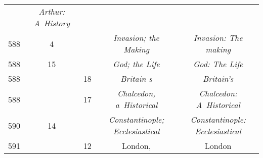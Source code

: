 \documentclass[a4paper,11pt]{article}
\begin{document}
\begin{center}
\begin{tabular}{|c|c|c|c|c|}
    & \textit{Arthur: A~History} \\
    588 & \hphantom{0}4 & & \textit{Invasion; the Making}
           & \textit{Invasion: The making} \\
    588 & 15 & & \textit{God; the Life} & \textit{God: The Life} \\
    588 & & 18 & \textit{Britain s} & \textit{Britain's} \\
    588 & & 17 & \textit{Chalcedon, a~Historical}
           & \textit{Chalcedon: A~Historical} \\
    590 & 14 & & \textit{Constantinople; Ecclesiastical}
           & \textit{Constantinople: Ecclesiastical} \\
    591 & & 12 & London, & London \\
    \hline
  \end{tabular}





  \newpage


\end{center}
\end{document}
